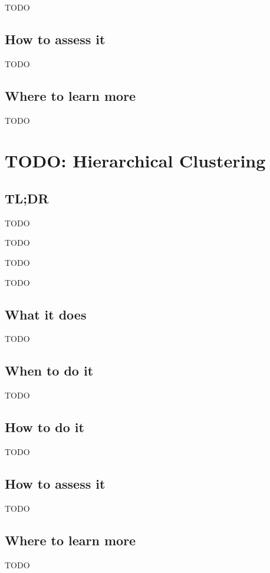 \documentclass[
]{book}
\providecommand{\tightlist}{%
  \setlength{\itemsep}{0pt}\setlength{\parskip}{0pt}}
\begin{document}
TODO

\hypertarget{how-to-assess-it-22}{%
\section{How to assess it}\label{how-to-assess-it-22}}

TODO

\hypertarget{where-to-learn-more-22}{%
\section{Where to learn more}\label{where-to-learn-more-22}}

TODO

\hypertarget{hierarchical-clustering}{%
\chapter{TODO: Hierarchical Clustering}\label{hierarchical-clustering}}

\hypertarget{tldr-23}{%
\section{TL;DR}\label{tldr-23}}

\begin{description}
\tightlist
\item[What it does]
TODO
\item[When to do it]
TODO
\item[How to do it]
TODO
\item[How to assess it]
TODO
\end{description}

\hypertarget{what-it-does-23}{%
\section{What it does}\label{what-it-does-23}}

TODO

\hypertarget{when-to-do-it-23}{%
\section{When to do it}\label{when-to-do-it-23}}

TODO

\hypertarget{how-to-do-it-23}{%
\section{How to do it}\label{how-to-do-it-23}}

TODO

\hypertarget{how-to-assess-it-23}{%
\section{How to assess it}\label{how-to-assess-it-23}}

TODO

\hypertarget{where-to-learn-more-23}{%
\section{Where to learn more}\label{where-to-learn-more-23}}

TODO

  
\end{document}
